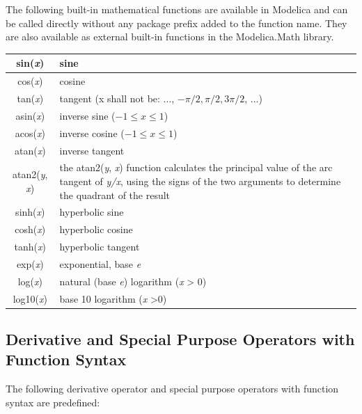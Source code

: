 \documentclass[10pt,a4paper]{report}
\def\doublelabel#1{\label{#1}\hypertarget{#1}{}}
\begin{document}
The following built-in mathematical functions are available in Modelica
and can be called directly without any package prefix added to the
function name. They are also available as external built-in functions in
the Modelica.Math library.

\begin{longtable}{|c|p{8cm}|} \hline
sin(\emph{x}) & sine\\ \hline
cos(\emph{x}) & cosine\\ \hline
tan(\emph{x}) & tangent (x shall not be: ..., $-\pi/2, \pi/2, 3\pi/2$,
...)\\ \hline
asin(\emph{x}) & inverse sine ($-1 \le x \le 1$)\\ \hline
acos(\emph{x}) & inverse cosine ($-1 \le x \le 1$)\\ \hline
atan(\emph{x}) & inverse tangent\\ \hline
atan2(\emph{y}, \emph{x}) & the atan2(\emph{y},
\emph{x}) function calculates the principal value of the arc tangent of
\emph{y/x}, using the signs of the two arguments to
determine the quadrant of the result\\ \hline
sinh(\emph{x}) & hyperbolic sine\\ \hline
cosh(\emph{x}) & hyperbolic cosine\\ \hline
tanh(\emph{x}) & hyperbolic tangent\\ \hline
exp(\emph{x}) & exponential, base \emph{e}\\ \hline
log(\emph{x}) & natural (base \emph{e}) logarithm (\emph{x}
\textgreater{} 0)\\ \hline
log10(\emph{x}) & base 10 logarithm (\emph{x} \textgreater{}0)\\ \hline
\end{longtable}


\subsection{Derivative and Special Purpose Operators with Function Syntax}\doublelabel{derivative-and-special-purpose-operators-with-function-syntax}

The following derivative operator and special purpose operators with
function syntax are predefined:
\end{document}
